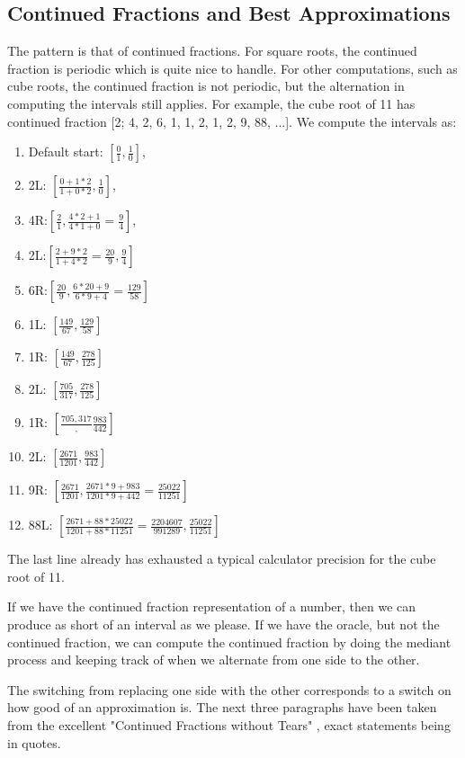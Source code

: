 \documentclass[12pt]{article}
\theoremstyle{remark}
\begin{document}
\subsection{Continued Fractions and Best Approximations}


The pattern is that of continued fractions. For square roots, the continued fraction is periodic which is quite nice to handle. For other computations, such as cube roots, the continued fraction is not periodic, but the alternation in computing the intervals still applies. For example, the cube root of 11 has continued fraction [2; 4, 2, 6, 1, 1, 2, 1, 2, 9, 88, ...]. We compute the intervals as:  
\begin{enumerate}
\item Default start: $[\frac{0}{1}, \frac{1}{0}]$, 
\item 2L: $[\frac{0+1*2}{1+0*2}, \frac{1}{0}]$, 
\item 4R:$[\frac{2}{1}, \frac{4*2+1}{4*1+0} =\frac{9}{4}]$, 
\item 2L:$[\frac{2+9*2}{1+4*2} = \frac{20}{9}, \frac{9}{4}]$
\item 6R:$[\frac{20}{9}, \frac{6*20+9}{6*9 + 4} = \frac{129}{58}]$
\item 1L: $[\frac{149}{67}, \frac{129}{58}]$
\item 1R: $[\frac{149}{67}, \frac{278}{125}]$
\item 2L: $[\frac{705}{317}, \frac{278}{125}]$
\item 1R: $[\frac{705, 317}, \frac{983}{442}]$
\item 2L: $[\frac{2671}{1201}, \frac{983}{442}]$
\item 9R: $[\frac{2671}{1201}, \frac{2671*9+983}{1201*9+442} = \frac{25022}{11251}]$
\item 88L: $[\frac{2671+88*25022}{1201+88*11251} = \frac{2204607}{991289}, \frac{25022}{11251}]$
\end{enumerate}

The last line already has exhausted a typical calculator precision for the cube root of 11. 

If we have the continued fraction representation of a number, then we can produce as short of an interval as we please. If we have the oracle, but not the continued fraction, we can compute the continued fraction by doing the mediant process and keeping track of when we alternate from one side to the other. 

The switching from replacing one side with the other corresponds to a switch on how good of an approximation is. The next three paragraphs have been taken from the excellent "Continued Fractions without Tears" \cite{richards}, exact statements being in quotes.  
\end{document}
